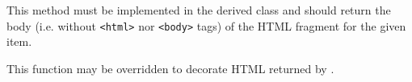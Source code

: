 \label{wxhtmllistboxongetitem}


This method must be implemented in the derived class and should return
the body (i.e. without {\tt <html>} nor {\tt <body>} tags) of the HTML fragment
for the given item.


\label{wxhtmllistboxongetitemmarkup}


This function may be overridden to decorate HTML returned by
.

